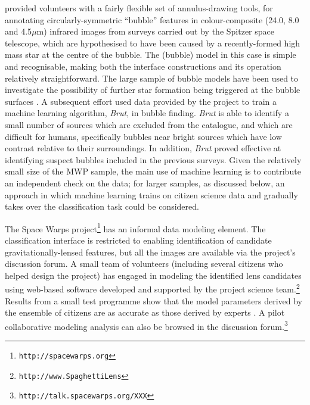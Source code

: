 \documentclass{ar2e}
\begin{document}
\citet{SimpsonEtal2012} provided volunteers with a fairly flexible set of
annulus-drawing tools, for annotating circularly-symmetric ``bubble'' features
in colour-composite (24.0, 8.0 and  4.5$\mu$m) infrared images from surveys
carried out by the Spitzer space telescope, which are hypothesised to have been
caused by a recently-formed high mass star at the centre of the bubble. The
(bubble) model in this case is simple and recognisable, making both the
interface constructions and its operation relatively straightforward. The large
sample of  bubble models have been used to investigate the possibility of
further star formation being triggered at the bubble surfaces
\citep{KendrewEtal2012}. A subsequent effort \citep{Beaumont} used data provided
by the project to train a machine learning algorithm, \emph{Brut}, in bubble
finding. \emph{Brut} is able to identify a small number of sources which are
excluded from the \citeauthor{SimpsonEtal2012} catalogue, and which are
difficult for humans, specifically bubbles near bright sources which have low
contrast relative to their surroundings. In addition, \emph{Brut} proved
effective at identifying suspect bubbles included in the previous surveys. Given
the relatively small size of the MWP sample, the main use of machine learning is
to contribute an independent check on the data; for larger samples, as discussed
below, an approach in which machine learning trains on citizen science data and
gradually takes over the classification task could be considered. 

The Space Warps project\footnote{\texttt{http://spacewarps.org}} has an informal
data modeling element. The classification interface is restricted to enabling
identification of candidate gravitationally-lensed features, but all the images
are available via the project's discussion forum. A small team of volunteers
(including several citizens who helped design the project) has engaged in
modeling the  identified lens candidates using web-based software developed and
supported by the project science
team.\footnote{\texttt{http://www.SpaghettiLens}} Results from a small test
programme show that the model parameters derived by the  ensemble of citizens
are as accurate as those derived by experts \citep{KuengEtal2014}. A pilot
collaborative modeling analysis can also be browsed in the discussion
forum.\footnote{\texttt{http://talk.spacewarps.org/XXX}}

\end{document}
